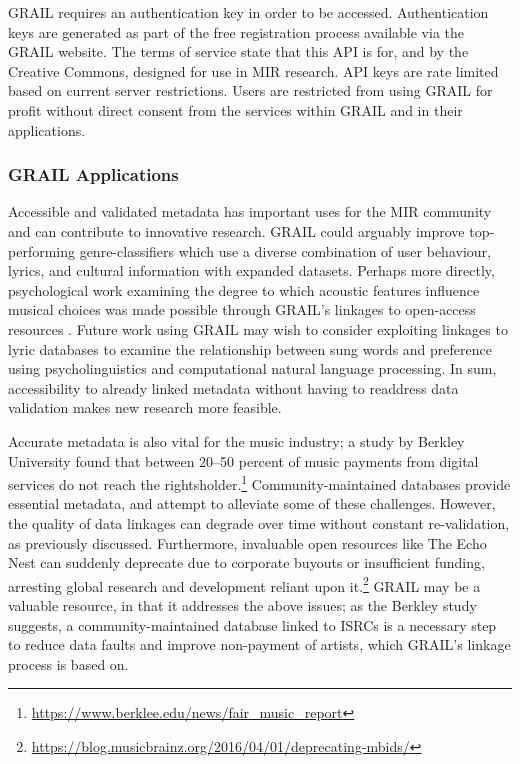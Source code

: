 \documentclass[a4paper]{article}
\begin{document}
\Gls{GRAIL} requires an authentication key in order to be accessed. Authentication keys are generated as part of the free registration process available via the \Gls{GRAIL} website. The terms of service state that this \Gls{API} is for, and by the Creative Commons, designed for use in MIR research. \Gls{API} keys are rate limited based on current server restrictions. Users are restricted from using \Gls{GRAIL} for profit without direct consent from the services within \Gls{GRAIL} and in their applications.

\subsubsection{GRAIL Applications}
Accessible and validated metadata has important uses for the MIR community and can contribute to innovative research. \Gls{GRAIL} could arguably improve top-performing genre-classifiers which use a diverse combination of user behaviour, lyrics, and cultural information \cite{mckay2010evaluating} with expanded datasets. Perhaps more directly, psychological work examining the degree to which acoustic features influence musical choices was made possible through \Gls{GRAIL}'s linkages to open-access resources \cite{barone2017leaky,bansal2015predictive}. Future work using \Gls{GRAIL} may wish to consider exploiting linkages to lyric databases to examine the relationship between sung words and preference using psycholinguistics and computational natural language processing. In sum, accessibility to already linked metadata without having to readdress data validation makes new research more feasible.

Accurate metadata is also vital for the music industry; a study by Berkley University found that between 20--50 percent of music payments from digital services do not reach the rightsholder.\footnote{\url{https://www.berklee.edu/news/fair_music_report}} Community-maintained databases \cite{bertin:00, swartz2002musicbrainz, cannam2010linked} provide essential metadata, and attempt to alleviate some of these challenges. However, the quality of data linkages can degrade over time without constant re-validation, as previously discussed. Furthermore, invaluable open resources like The Echo Nest can suddenly deprecate due to corporate buyouts or insufficient funding, arresting global research and development reliant upon it.\footnote{\url{https://blog.musicbrainz.org/2016/04/01/deprecating-mbids/}} \Gls{GRAIL} may be a valuable resource, in that it addresses the above issues; as the Berkley study suggests, a community-maintained database linked to \Gls{ISRC}s is a necessary step to reduce data faults and improve non-payment of artists, which \Gls{GRAIL}'s linkage process is based on.
\end{document}
